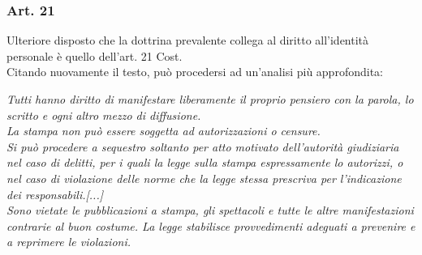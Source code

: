 



\subsubsection{Art. 21}
Ulteriore disposto che la dottrina prevalente collega al diritto all'identità personale è quello dell'art. 21 Cost.
\\Citando nuovamente il testo, può procedersi ad un'analisi più approfondita:

\textit{Tutti hanno diritto di manifestare liberamente il proprio pensiero con la parola, lo scritto e ogni altro mezzo di diffusione.\\La stampa non può essere soggetta ad autorizzazioni o censure.\\Si può procedere a sequestro soltanto per atto motivato dell'autorità giudiziaria nel caso di delitti, per i quali la legge sulla stampa espressamente lo autorizzi, o nel caso di violazione delle norme che la legge stessa prescriva per l'indicazione dei responsabili.[...]\\Sono vietate le pubblicazioni a stampa, gli spettacoli e tutte le altre manifestazioni contrarie al buon costume. La legge stabilisce provvedimenti adeguati a prevenire e a reprimere le violazioni.}

